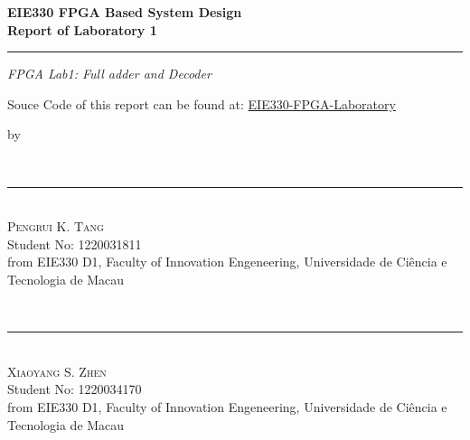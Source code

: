 \documentclass[a4paper,11pt]{article}
\begin{document}
\begin{titlepage}
    \ActivateWarningFilters[latex]

    \parbox{1\textwidth}{ %
        {\Large\bfseries EIE330 FPGA Based System Design}\\[0.5\baselineskip] %
        {\Huge\bfseries Report of Laboratory 1}\\[0.15\baselineskip] %
		\rule{1\textwidth}{1pt} %
        {\Large\textit{FPGA Lab1: Full adder and Decoder}}
    }
    \parbox{1\textwidth}{
        \vspace{1\baselineskip}
        \large
        Souce Code of this report can be found at:
        \href{https://github.com/ZeppelinSCB/EIE330-FPGA-Laboratory}
            {EIE330-FPGA-Laboratory}
    }
    \parbox{1\textwidth}{
        \vspace{1\baselineskip}
        \large by
    }
    \parbox{1\textwidth}{
        {~\\[1.7\baselineskip]}
        {\rule[1pt]{200pt}{1pt}} \\[1.25pt]
        {\huge\textsc{Pengrui K. Tang}
        }\\
        {\large{Student No: 1220031811}} \\
        \large from EIE330 D1, \newline
        Faculty of Innovation Engeneering, \newline
        Universidade de Ciência e Tecnologia de Macau
    }
    \parbox{1\textwidth}{
        {~\\[1.7\baselineskip]}
        {\rule[1pt]{200pt}{1pt}} \\[1.25pt]
        {\huge\textsc{Xiaoyang S. Zhen}
            }\\
        {\large{Student No: 1220034170}} \\
        \large from EIE330 D1, \newline
        Faculty of Innovation Engeneering, \newline
        Universidade de Ciência e Tecnologia de Macau
    }
	\FloatBarrier


\end{titlepage}
\end{document}
